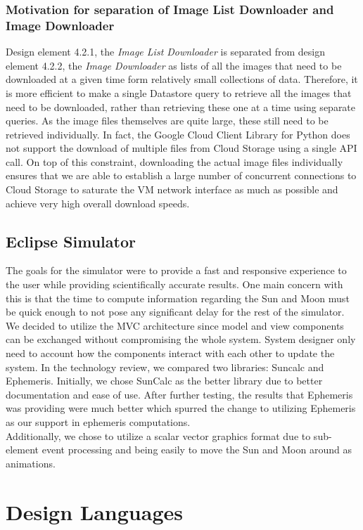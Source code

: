 \documentclass[10pt, onecolumn, draftclsnofoot, letterpaper, compsoc]{IEEEtran}
\begin{document}
    \subsubsection{Motivation for separation of Image List Downloader and Image Downloader}
    Design element 4.2.1, the \textit{Image List Downloader} is separated from design element 4.2.2, the 
    \textit{Image Downloader} as lists of all the images that need to be downloaded at a given time form 
    relatively small collections of data. Therefore, it is more efficient to make a single Datastore query to 
    retrieve all the images that need to be downloaded, rather than retrieving these one at a time using 
    separate queries. As the image files themselves are quite large, these still need to be retrieved 
    individually. In fact, the Google Cloud Client Library for Python does not support the download of multiple 
    files from Cloud Storage using a single API call. On top of this constraint, downloading the actual image 
    files individually ensures that we are able to establish a large number of concurrent connections to Cloud 
    Storage to saturate the VM network interface as much as possible and achieve very high overall download 
    speeds. \\

\subsection{Eclipse Simulator}


The goals for the simulator were to provide a fast and
responsive experience to the user while providing
scientifically accurate results. One main concern with this
is that the time to compute information regarding the Sun
and Moon must be quick enough to not pose any significant
delay for the rest of the simulator. \\

We decided to utilize the MVC architecture since model and
view components can be exchanged without compromising the
whole system. System designer only need to account how the
components interact with each other to update the system.
In the technology review, we compared two libraries: Suncalc
and Ephemeris. Initially, we chose SunCalc as the better
library due to better documentation and ease of use. After
further testing, the results that Ephemeris was providing
were much better which spurred the change to utilizing
Ephemeris as our support in ephemeris computations. \\

Additionally, we chose to utilize a scalar vector graphics
format due to sub-element event processing and being easily
to move the Sun and Moon around as animations. \\

\section{Design Languages}


\newpage



\end{document}
